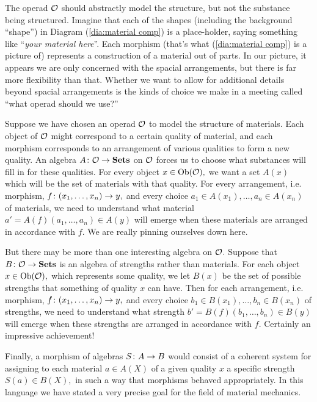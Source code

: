 \documentclass[../main/CT4S-EN-RU]{subfiles}
\begin{document}
\begin{applicationENG}
The operad $\mathcal{O}$ should abstractly model the structure, but not the substance being structured. Imagine that each of the shapes (including the background “shape”) in Diagram (\ref{dia:material comp}) is a place-holder, saying something like “{\em your material here}”. Each morphism (that's what (\ref{dia:material comp}) is a picture of) represents a construction of a material out of parts. In our picture, it appears we are only concerned with the spacial arrangements, but there is far more flexibility than that. Whether we want to allow for additional details beyond spacial arrangements is the kinds of choice we make in a meeting called “what operad should we use?” 
\end{applicationENG}

\begin{applicationRUS}
\end{applicationRUS}

\begin{applicationENG}
Suppose we have chosen an operad $\mathcal{O}$ to model the structure of materials. Each object of $\mathcal{O}$ might correspond to a certain quality of material, and each morphism corresponds to an arrangement of various qualities to form a new quality. An algebra $A\colon\mathcal{O}\rightarrow{\mathbf{Sets}}$ on $\mathcal{O}$ forces us to choose what substances will fill in for these qualities. For every object $x\in\operatorname{Ob}(\mathcal{O}),$ we want a set $A(x)$ which will be the set of materials with that quality. For every arrangement, i.e. morphism, $f\colon (x_1,\ldots,x_n)\rightarrow y,$ and every choice $a_1\in A(x_1), \ldots, a_n\in A(x_n)$ of materials, we need to understand what material $a'=A(f)(a_1,\ldots,a_n)\in A(y)$ will emerge when these materials are arranged in accordance with $f.$ We are really pinning ourselves down here.

But there may be more than one interesting algebra on $\mathcal{O}.$ Suppose that $B\colon\mathcal{O}\rightarrow{\mathbf{Sets}}$ is an algebra of strengths rather than materials. For each object $x\in\operatorname{Ob}(\mathcal{O}),$ which represents some quality, we let $B(x)$ be the set of possible strengths that something of quality $x$ can have. Then for each arrangement, i.e. morphism, $f\colon (x_1,\ldots,x_n)\rightarrow y,$ and every choice $b_1\in B(x_1), \ldots, b_n\in B(x_n)$ of strengths, we need to understand what strength $b'=B(f)(b_1,\ldots,b_n)\in B(y)$ will emerge when these strengths are arranged in accordance with $f.$ Certainly an impressive achievement!

Finally, a morphism of algebras $S\colon A\rightarrow B$ would consist of a coherent system for assigning to each material $a\in A(X)$ of a given quality $x$ a specific strength $S(a)\in B(X),$ in such a way that morphisms behaved appropriately. In this language we have stated a very precise goal for the field of material mechanics.
\end{applicationENG}
\end{document}
